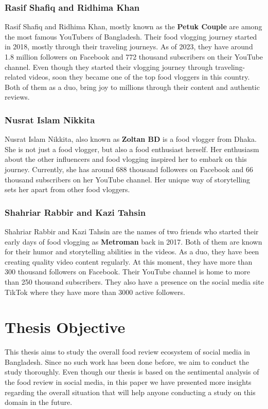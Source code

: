 \subsubsection{Rasif Shafiq and Ridhima Khan}
Rasif Shafiq and Ridhima Khan, mostly known as the \textbf{Petuk Couple} are among the most famous YouTubers of Bangladesh. Their food vlogging journey started in 2018, mostly through their traveling journeys. As of 2023, they have around 1.8 million followers on Facebook and 772 thousand subscribers on their YouTube channel. Even though they started their vlogging journey through traveling-related videos, soon they became one of the top food vloggers in this country. Both of them as a duo, bring joy to millions through their content and authentic reviews.

\subsubsection{Nusrat Islam Nikkita}
Nusrat Islam Nikkita, also known as \textbf{Zoltan BD} is a food vlogger from Dhaka. She is not just a food vlogger, but also a food enthusiast herself. Her enthusiasm about the other influencers and food vlogging inspired her to embark on this journey. Currently, she has around 688 thousand followers on Facebook and 66 thousand subscribers on her YouTube channel. Her unique way of storytelling sets her apart from other food vloggers.

\subsubsection{Shahriar Rabbir and Kazi Tahsin}
Shahriar Rabbir and Kazi Tahsin are the names of two friends who started their early days of food vlogging as \textbf{Metroman} back in 2017. Both of them are known for their humor and storytelling abilities in the videos. As a duo, they have been creating quality video content regularly. At this moment, they have more than 300 thousand followers on Facebook. Their YouTube channel is home to more than 250 thousand subscribers. They also have a presence on the social media site TikTok where they have more than 3000 active followers.



\section{Thesis Objective}
This thesis aims to study the overall food review ecosystem of social media in Bangladesh. Since no such work has been done before, we aim to conduct the study thoroughly. Even though our thesis is based on the sentimental analysis of the food review in social media, in this paper we have presented more insights regarding the overall situation that will help anyone conducting a study on this domain in the future.

